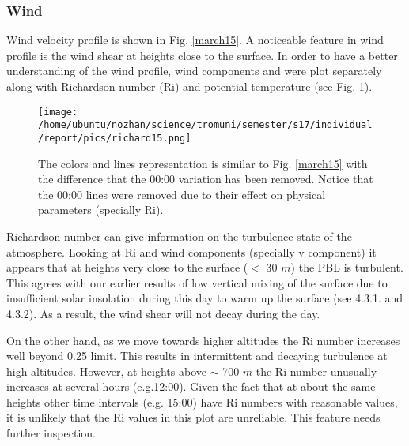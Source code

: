 \documentclass[a4paper,12pt]{article}
\numberwithin{equation}{section} %
\begin{document}
\subsubsection{Wind}

Wind velocity profile is shown in Fig. \ref{march15}. A noticeable feature in wind profile is the wind shear at heights close to the surface. In order to have a better understanding of the wind profile, wind components and were plot separately along with Richardson number (Ri) and potential temperature (see Fig. \ref{richard15}).

\begin{figure}[bhp]
\texttt{[image: /home/ubuntu/nozhan/science/tromuni/semester/s17/individual/report/pics/richard15.png]}
\caption{The colors and lines representation is similar to Fig. \ref{march15} with the difference that the 00:00 variation has been removed. Notice that the 00:00 lines were removed due to their effect on physical parameters (specially Ri).}
\label{richard15}
\end{figure}

Richardson number can give information on the turbulence state of the atmosphere. Looking at Ri and wind components (specially v component) it appears that at heights very close to the surface ($<$ 30 $m$) the PBL is turbulent. This agrees with our earlier results of low vertical mixing of the surface due to insufficient solar insolation during this day to warm up the surface (see 4.3.1. and 4.3.2). As a result, the wind shear will not decay during the day.

On the other hand, as we move towards higher altitudes the Ri number increases well beyond 0.25 limit. This results in intermittent and decaying turbulence at high altitudes. However, at heights above $\sim$ 700 $m$ the Ri number unusually increases at several hours (e.g.12:00). Given the fact that at about the same heights other time intervals (e.g. 15:00) have Ri numbers with reasonable values, it is unlikely that the Ri values in this plot are unreliable. This feature needs further inspection. 

\end{document}
